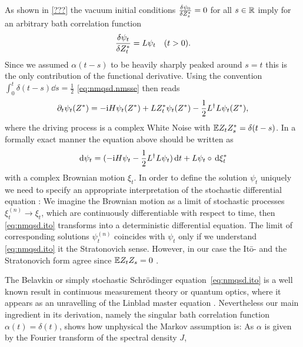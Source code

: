 As shown in \autoref{???} the vacuum initial conditions $\frac{\delta \psi_0}{\delta {Z}^*_s} = 0$ for all $s \in \mathbb{R}$ imply for an arbitrary bath correlation function
\begin{equation}
  \frac{\delta \psi_t}{\delta {Z}^*_t} = L \psi_t \quad (t > 0).
  \label{eq:nmqsd.dpsit_dzt}
\end{equation}
Since we assumed $\alpha(t-s)$ to be heavily sharply peaked around $s = t$ this is the only contribution of the functional derivative.
Using the convention $\int_0^t \delta(t-s) \dd s = \frac{1}{2}$ \autoref{eq:nmqsd.nmsse} then reads
\begin{equation*}
  \partial_t \psi_t({Z}^*) = -\mathrm{i} H \psi_t({Z}^*) + L{Z}^*_t\psi_t({Z}^*) - \frac{1}{2}L^\dagger L\psi_t({Z}^*),
\end{equation*}
where the driving process is a complex White Noise with $\E{Z_t \ZZ_s} = \delta(t-s)$.
In a formally exact manner the equation above should be written as
\begin{equation}
  \, \mathrm{d}\psi_t = (-\mathrm{i}H\psi_t - \frac{1}{2} L^\dagger L \psi_t) \, \mathrm{d} t + L\psi_t \circ \, \mathrm{d} {\xi}^*_t
  \label{eq:nmqsd.ito}
\end{equation}
with a complex Brownian motion $\xi_t$.
In order to define the solution $\psi_t$ uniquely we need to specify an appropriate interpretation of the stochastic differential equation \cite[p.~36]{Ok03_sde}:
We imagine the Brownian motion as a limit of stochastic processes $\xi^{(n)}_t \to \xi_t$, which are continuously differentiable with respect to time, then \autoref{eq:nmqsd.ito} transforms into a deterministic differential equation.
The limit of corresponding solutions $\psi^{(n)}_t$ coincides with $\psi_t$ only if we understand \autoref{eq:nmqsd.ito} it the Stratonovich sense.
However, in our case the It\=o- and the Stratonovich form agree since $\E Z_t Z_s = 0$ \cite[???]{GaCr85_handbook}.

The Belavkin or simply stochastic Schrödinger equation~\ref{eq:nmqsd.ito} is a well known result in continuous measurement theory or quantum optics, where it appears as an unravelling of the Linblad master equation \cite{BaGr09_trajectories,???}.
Nevertheless our main ingredient in its derivation, namely the singular bath correlation function $\alpha(t) = \delta(t)$, shows how unphysical the Markov assumption is:
As $\alpha$ is given by the Fourier transform of the spectral density $J$,


